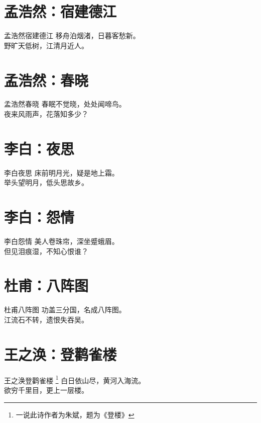 \documentclass[12pt,oneside,a5paper]{book}
\begin{document}
\chapter{孟浩然：宿建德江}
\begin{poemzh}{孟浩然}{宿建德江}
移舟泊烟渚，日暮客愁新。\\
野旷天低树，江清月近人。\\ 
\end{poemzh}

\chapter{孟浩然：春晓}
\begin{poemzh}{孟浩然}{春晓}
春眠不觉晓，处处闻啼鸟。\\
夜来风雨声，花落知多少？\\ 
\end{poemzh}

\chapter{李白：夜思}
\begin{poemzh}{李白}{夜思}
床前明月光，疑是地上霜。\\
举头望明月，低头思故乡。\\ 
\end{poemzh}

\chapter{李白：怨情}
\begin{poemzh}{李白}{怨情}
美人卷珠帘，深坐蹙蛾眉。\\
但见泪痕湿，不知心恨谁？\\ 
\end{poemzh}

\chapter{杜甫：八阵图}
\begin{poemzh}{杜甫}{八阵图}
功盖三分国，名成八阵图。\\
江流石不转，遗恨失吞吴。\\ 
\end{poemzh}

\chapter{王之涣：登鹳雀楼}
\begin{poemzh}{王之涣}{登鹳雀楼}
\footnote{一说此诗作者为朱斌，题为《登楼》}
白日依山尽，黄河入海流。\\
欲穷千里目，更上一层楼。\\ 
\end{poemzh}
\end{document}
